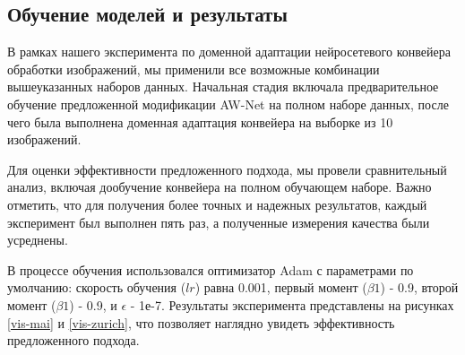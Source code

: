 \subsection{Обучение моделей и результаты}\label{sect-5-3}

В рамках нашего эксперимента по доменной адаптации нейросетевого конвейера обработки изображений, мы применили все возможные комбинации вышеуказанных наборов данных. Начальная стадия включала предварительное обучение предложенной модификации AW-Net на полном наборе данных, после чего была выполнена доменная адаптация конвейера на выборке из 10 изображений.

Для оценки эффективности предложенного подхода, мы провели сравнительный анализ, включая дообучение конвейера на полном обучающем наборе. Важно отметить, что для получения более точных и надежных результатов, каждый эксперимент был выполнен пять раз, а полученные измерения качества были усреднены.

В процессе обучения использовался оптимизатор Adam с параметрами по умолчанию: скорость обучения ($lr$) равна 0.001, первый момент ($\beta1$) - 0.9, второй момент ($\beta1$) - 0.9, и $\epsilon$ - 1е-7. Результаты эксперимента представлены на рисунках \ref{vis-mai} и \ref{vis-zurich}, что позволяет наглядно увидеть эффективность предложенного подхода.



